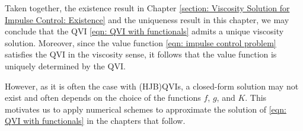 Taken together, the existence result in Chapter \ref{section: Viscosity Solution for Impulse Control: Existence} and the uniqueness result in this chapter, we may conclude that the QVI \eqref{eqn: QVI with functionals} admits a unique viscosity solution. Moreover, since the value function \eqref{eqn: impulse control problem} satisfies the QVI in the viscosity sense, it follows that the value function is uniquely determined by the QVI. 

However, as it is often the case with (HJB)QVIs, a closed-form solution may not exist and often depends on the choice of the functions $f$, $g$, and $K$. This motivates us to apply numerical schemes to approximate the solution of \eqref{eqn: QVI with functionals} in the chapters that follow. 